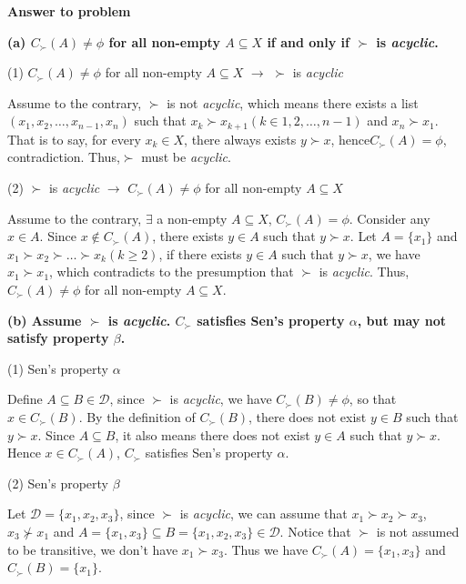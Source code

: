 \documentclass[12pt, a4paper, oneside]{article}
\newcounter{answername}
\newenvironment{answer}{\stepcounter{answername}\par\noindent\textbf{Answer to problem \arabic{answername}\newline}}{\\\par}
\begin{document}
\begin{answer}

\noindent\textbf{(a)
$C_{\succ}(A) \neq \phi$ for all non-empty $A\subseteq X$ if and only if $\succ$ is \textit{acyclic}.}
\newline

\noindent(1) $C_{\succ}(A) \neq \phi$ for all non-empty $A\subseteq X$ $\rightarrow$ $\succ$ is \textit{acyclic}

Assume to the contrary, $\succ$ is not \textit{acyclic}, 
which means there exists a list $(x_1, x_2, \dots, x_{n−1}, x_n)$ such that $x_k\succ x_{k+1}(k\in1,2,\dots,n-1)$ and $ x_n\succ x_1$. 
That is to say, for every $x_k\in X$, there always exists $y\succ x$, hence$ C_{\succ}(A) = \phi$, contradiction. 
Thus,$\succ $ must be \textit{acyclic}.
 \newline

\noindent(2) $\succ$ is \textit{acyclic} $\rightarrow$ $C_{\succ}(A) \neq \phi$ for all non-empty $A\subseteq X$

Assume to the contrary, $\exists $ a non-empty $A\subseteq X$, $C_{\succ}(A) = \phi$. 
Consider any $x\in A$. 
Since $x \notin C_{\succ}(A)$, there exists $y\in A$ such that $y\succ x$. 
Let $A=\{x_1\}$ and $x_1\succ x_2\succ\dots\succ x_k(k\geq2)$, 
if there exists $y\in A$ such that $y \succ x$, we have $x_1\succ x_1$, 
which contradicts to the presumption that $\succ$ is \textit{acyclic}. 
Thus, $C_{\succ}(A) \neq \phi$ for all non-empty $A\subseteq X$.
\newline

\noindent\textbf{(b)
Assume $\succ$ is \textit{acyclic}. $C_{\succ}$ satisfies Sen's property $\alpha$, but may not satisfy property $\beta$.}
\newline

\noindent(1) Sen's property $\alpha$

Define $A\subseteq B\in\mathscr{D}$, since $\succ$ is \textit{acyclic}, 
we have $C_{\succ}(B)\neq \phi$, so that $ x\in C_{\succ}(B)$. 
By the definition of $C_{\succ}(B)$, there does not exist $y\in B$ such that $y\succ x$. 
Since $A\subseteq B$, it also means there does not exist $ y\in A$ such that $y\succ x$. 
Hence $x\in C_{\succ}(A)$, $C_{\succ}$ satisfies Sen's property $\alpha$.
\newline

\noindent(2) Sen's property $\beta$

Let $\mathscr{D}=\{x_1,x_2,x_3\}$, since $\succ$ is \textit{acyclic}, 
we can assume that $x_1\succ x_2\succ x_3$, $x_3\nsucc x_1$ and $ A=\{x_1,x_3\}\subseteq B=\{x_1,x_2,x_3\}\in \mathscr{D}$.
Notice that $\succ $ is not assumed to be transitive, we don't have $x_1\succ x_3$.
Thus we have $C_{\succ}(A)=\{x_1,x_3\}$ and $ C_{\succ}(B)=\{x_1\}$.
\end{answer}
\end{document}
